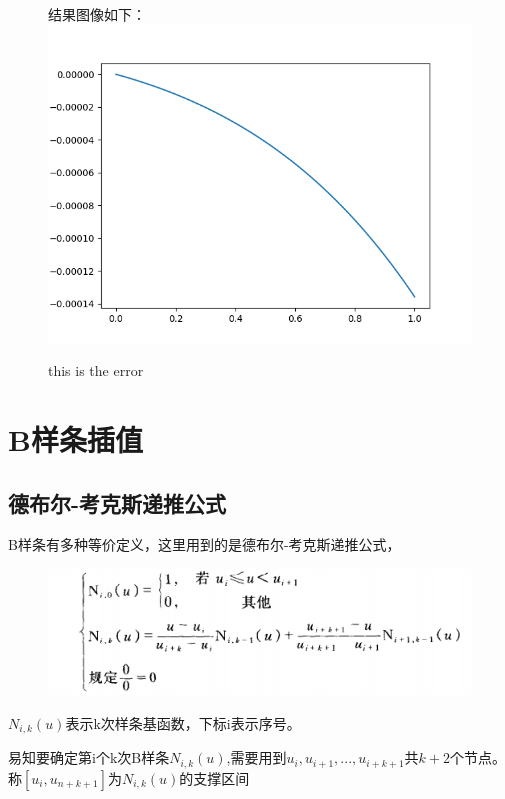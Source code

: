 \documentclass[12pt,a4paper]{article}
\begin{document}
\begin{figure}[ht]
结果图像如下：\\
	\centering
	\includegraphics[scale=0.6]{./figures/Figure_6.png}
	\caption{this is the error}
	\label{fig:label}
\end{figure}

\newpage
\section{B样条插值}
\subsection{德布尔-考克斯递推公式}
B样条有多种等价定义，这里用到的是德布尔-考克斯递推公式，
\begin{figure}[ht]
	\centering
	\includegraphics[scale=0.6]{./figures/Figure_7.png}
	\caption{ }
	\label{fig:label}
\end{figure}

$N_{i,k}(u)$表示k次样条基函数，下标i表示序号。

易知要确定第i个k次B样条$N_{i,k}(u)$,需要用到$u_i,u_{i+1},...,u_{i+k+1}$共$k+2$个节点。称$[u_i,u_{n+k+1}]为N_{i,k}(u)$的支撑区间
\end{document}
